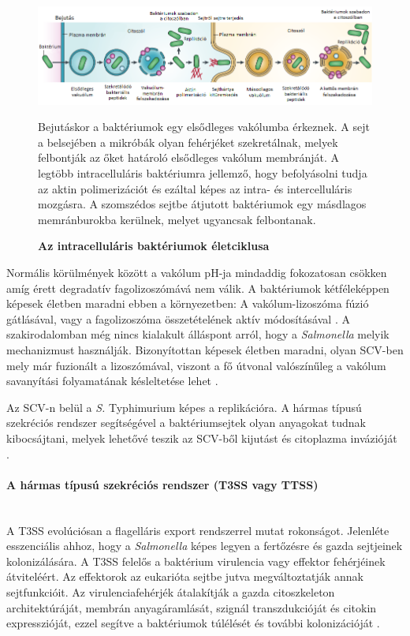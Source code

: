 \documentclass[a4paper,12pt]{article}
\newenvironment{imgdesc}{
		\small
		\singlespacing
		\begin{center}
		
	}{
		\end{center}	
	}
\begin{document}
		 \begin{figure}[H]
			 \centering
			 \includegraphics[scale=0.7]{img/intracell_bakt_terj_am.png}
			 \caption{\textbf{Az intracelluláris baktériumok életciklusa}}
			 \begin{imgdesc}
				 Bejutáskor a baktériumok egy elsődleges vakólumba érkeznek. A sejt a belsejében a mikróbák olyan fehérjéket szekretálnak, melyek felbontják az őket határoló elsődleges vakólum membránját. A legtöbb intracelluláris baktériumra jellemző, hogy befolyásolni tudja az aktin polimerizációt és ezáltal képes az intra- és intercelluláris mozgásra. A szomszédos sejtbe átjutott baktériumok egy másdlagos memránburokba kerülnek, melyet ugyancsak felbontanak.
			 \end{imgdesc}
			 \label{fig:salmo_cycle}
		 \end{figure}
		
		 Normális körülmények között a vakólum pH-ja mindaddig fokozatosan csökken amíg érett degradatív fagolizoszómává nem válik. A baktériumok kétféleképpen képesek életben maradni ebben a környezetben: A vakólum-lizoszóma fúzió gátlásával, vagy a fagolizoszóma összetételének aktív módosításával \cite{salmonella_autophagy_nature_old}. A szakirodalomban még nincs kialakult álláspont arról, hogy a \textit{Salmonella} melyik mechanizmust használják. Bizonyítottan képesek életben maradni, olyan SCV-ben mely már fuzionált a lizoszómával, viszont a fő útvonal valószínűleg a vakólum savanyítási folyamatának késleltetése lehet \cite{salmonella_and_host_cell_nature}. 
		 
		 Az SCV-n belül a \textit{S.} Typhimurium képes a replikációra. A hármas típusú szekréciós rendszer segítségével a baktériumsejtek olyan anyagokat tudnak kibocsájtani, melyek lehetővé teszik az SCV-ből kijutást és citoplazma invázióját \cite{salmonella_authopagy_intro}.
		 
		 \paragraph{A hármas típusú szekréciós rendszer (T3SS vagy TTSS)} \mbox{}\\
		 A T3SS evolúciósan a flagelláris export rendszerrel mutat rokonságot. Jelenléte esszenciális ahhoz, hogy a \textit{Salmonella} képes legyen a fertőzésre és gazda sejtjeinek kolonizálására. A T3SS felelős a baktérium virulencia vagy effektor fehérjéinek átviteléért. Az effektorok az eukarióta sejtbe jutva megváltoztatják annak sejtfunkcióit. Az virulenciafehérjék átalakítják a gazda citoszkeleton architektúráját, membrán anyagáramlását, szignál transzdukcióját és citokin expresszióját, ezzel segítve a baktériumok túlélését és további kolonizációját \cite{salmonella_and_host_cell_nature}.
		 
\end{document}
